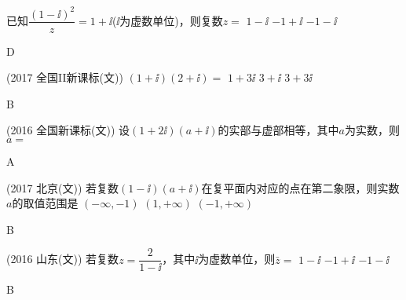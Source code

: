   \clearpage
  \begin{exercise}
    \item %
      已知$\dfrac{(1-\ii)^2}z=1+\ii$($\ii$为虚数单位)，则复数$z=$\xz
       {$1-\ii$}
       {$-1+\ii$}
       {$-1-\ii$}
      \begin{answer}
        D
      \end{answer}
    \item %
        {\kaishu (2017 \textbullet 全国II新课标(文))}
        $(1+\ii)(2+\ii)=$\xz
         {$1+3\ii$}
         {$3+\ii$}
         {$3+3\ii$}
        \begin{answer}
          B
        \end{answer}
    \item %
        {\kaishu (2016 \textbullet 全国新课标(文))}
        设$(1+2\ii)(a+\ii)$的实部与虚部相等，其中$a$为实数，则$a=$\xz
        \begin{answer}
          A
        \end{answer}
    \item %
        {\kaishu (2017 \textbullet 北京(文))}
        若复数$(1-\ii)(a+\ii)$在复平面内对应的点在第二象限，则实数$a$的取值范围是\xz
         {$(-\infty,-1)$}
         {$(1,+\infty)$}
         {$(-1,+\infty)$}
        \begin{answer}
          B
        \end{answer}
    \item %
        {\kaishu (2016 \textbullet 山东(文))}
        若复数$z=\dfrac2{1-\ii}$，其中$\ii$为虚数单位，则$\bar z=$\xz
         {$1-\ii$}
         {$-1+\ii$}
         {$-1-\ii$}
        \begin{answer}
          B
        \end{answer}
    \item %

\end{exercise}
